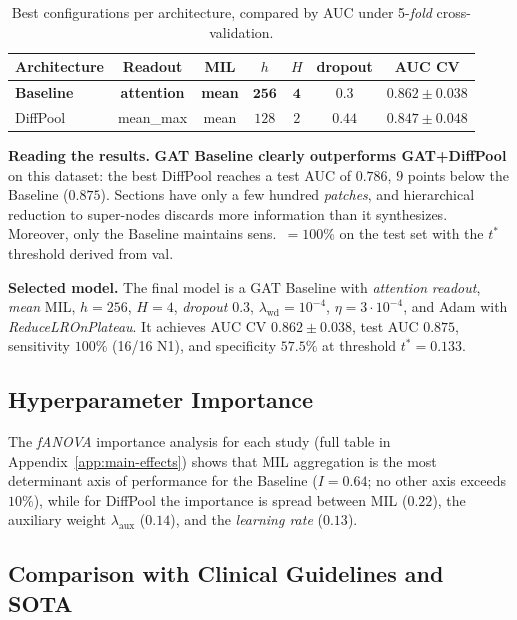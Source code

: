 \documentclass[10pt,a4paper,twocolumn,twoside]{article}
\begin{document}
\begin{table}[t]
\centering
\caption{Best configurations per architecture, compared by AUC under 5-\textit{fold}
cross-validation.}
\label{tab:configs-compare}
\small
\begin{tabular}{lcccccc}
\toprule
\textbf{Architecture} & \textbf{Readout} & \textbf{MIL}
  & \textbf{$h$} & \textbf{$H$} & \textbf{dropout} & \textbf{AUC CV} \\
\midrule
\textbf{Baseline}  & \textbf{attention} & \textbf{mean} & $\mathbf{256}$ & $\mathbf{4}$ & $\mathbf{0.3}$ & $\mathbf{0.862\!\pm\!0.038}$ \\
DiffPool           & mean\_max          & mean          & $128$          & $2$          & $0.44$         & $0.847\!\pm\!0.048$ \\
\bottomrule
\end{tabular}
\end{table}

\textbf{Reading the results.} \textbf{GAT Baseline clearly outperforms GAT+DiffPool}
on this dataset: the best DiffPool reaches a test AUC of $0.786$, $9$ points below the
Baseline ($0.875$). Sections have only a few hundred \textit{patches}, and
hierarchical reduction to super-nodes discards more information than it synthesizes. Moreover,
only the Baseline maintains sens.\ $=100\%$ on the test set with the $t^*$ threshold derived from val.

\textbf{Selected model.} The final model is a GAT Baseline with \textit{attention}
\textit{readout}, \textit{mean} MIL, $h=256$, $H=4$, \textit{dropout} $0.3$,
$\lambda_{\text{wd}}=10^{-4}$, $\eta=3\!\cdot\!10^{-4}$, and Adam with \textit{ReduceLROnPlateau}.
It achieves AUC CV $0.862\pm 0.038$, test AUC $0.875$, sensitivity $100\%$ (16/16 N1), and
specificity $57.5\%$ at threshold $t^*\!=\!0.133$.

\subsection{Hyperparameter Importance}
\label{sec:main-effects}

The \textit{fANOVA} importance analysis for each study (full table in
Appendix~\ref{app:main-effects}) shows that MIL aggregation is the most
determinant axis of performance for the Baseline ($I=0.64$; no other axis exceeds $10\%$),
while for DiffPool the importance is spread between MIL ($0.22$), the auxiliary
weight $\lambda_{\text{aux}}$ ($0.14$), and the \textit{learning rate} ($0.13$).

\subsection{Comparison with Clinical Guidelines and SOTA}
\label{sec:resultats-comparacio}
\end{document}
